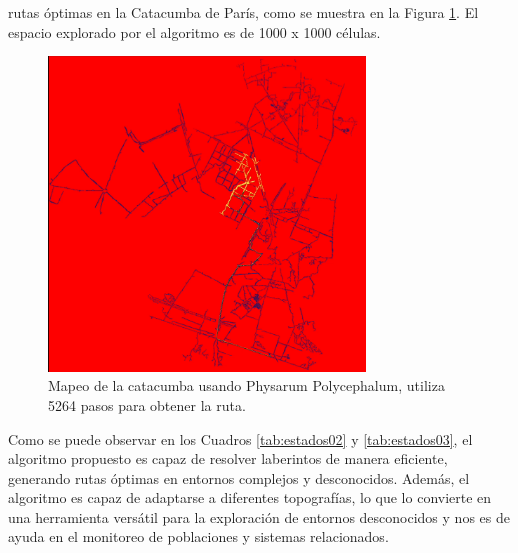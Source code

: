             rutas \'optimas en la Catacumba de Par\'is, como se muestra en la Figura \ref{fig:Catacomb}. El espacio
            explorado por el algoritmo es de 1000 x 1000 c\'elulas.
        \vskip 0.2cm
        \begin{figure}[htbp]
            \centerline{\includegraphics[width=0.75\textwidth]{./images/desarrollo/physarum/CatacoumbParis.png}}
            \caption{Mapeo de la catacumba usando Physarum Polycephalum, utiliza 5264 pasos para obtener la ruta.}
            \label{fig:Catacomb}
        \end{figure}
        \clearpage
        \vskip 0.5cm
        Como se puede observar en los Cuadros \ref{tab:estados02} y \ref{tab:estados03}, el algoritmo propuesto es capaz de resolver laberintos de manera eficiente, 
            generando rutas \'optimas en entornos complejos y desconocidos. Adem\'as, el algoritmo es capaz de adaptarse a diferentes topograf\'ias, 
            lo que lo convierte en una herramienta vers\'atil para la exploraci\'on de entornos desconocidos y nos es de ayuda en el monitoreo de poblaciones y sistemas relacionados.
        \vskip 0.5cm
